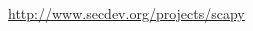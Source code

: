 \documentclass[%
	final, %
	notitlepage,
	narroweqnarray,
	inline,
	twoside,
	]{ieee}
\begin{document}
\begin{thebibliography}{1}






\url{http://www.secdev.org/projects/scapy}


\end{thebibliography}
\end{document}

